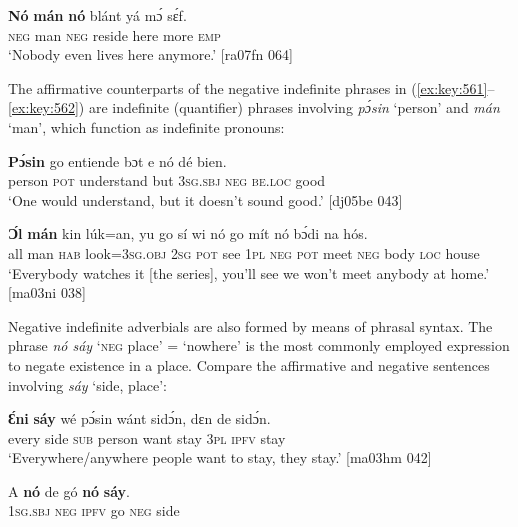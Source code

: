 \ea%
    \label{ex:key:562}
    \gll \textbf{Nó}  \textbf{mán}    \textbf{nó}  blánt  yá    mɔ́    sɛ́f.\\
\textsc{neg}  man    \textsc{neg}  reside  here    more  \textsc{emp}\\

\glt ‘Nobody even lives here anymore.’ [ra07fn 064]
\z

The affirmative counterparts of the negative indefinite phrases in (\ref{ex:key:561}–\ref{ex:key:562}) are indefinite (quantifier) phrases involving \textit{pɔ́sin} ‘person’ and \textit{mán} ‘man’, which function as indefinite pronouns:


\ea%
    \label{ex:key:563}
    \gll \textbf{Pɔ́sin}  go  entiende    bɔt  e    nó  dé    bien.\\
person  \textsc{pot}  understand  but  \textsc{3sg.sbj}  \textsc{neg}  \textsc{be.loc}  good\\

\glt ‘One would understand, but it doesn’t sound good.’ [dj05be 043]
\z


\ea%
    \label{ex:key:564}
    \gll \textbf{Ɔ́l}  \textbf{mán} kin  lúk=an,    yu  go  sí  wi  nó  go
mít    nó  bɔ́di    na  hós.\\
all  man    \textsc{hab}  look=\textsc{3sg.obj}  \textsc{2sg}  \textsc{pot}  see  \textsc{1pl}  \textsc{neg}  \textsc{pot}
meet  \textsc{neg}  body  \textsc{loc}  house\\

\glt ‘Everybody watches it [the series], you’ll see we won’t 
meet anybody at home.’ [ma03ni 038]
\z

Negative indefinite adverbials are also formed by means of phrasal syntax. The phrase \textit{nó sáy} ‘\textsc{neg} place’ = ‘nowhere’ is the most commonly employed expression to negate existence in a place. Compare the affirmative and negative sentences involving \textit{sáy} ‘side, place’: 


\ea%
    \label{ex:key:565}
    \gll \textbf{Ɛ́ni}    \textbf{sáy}  wé  pɔ́sin  wánt  sidɔ́n,  dɛn  de  sidɔ́n.\\
every  side  \textsc{sub}  person  want  stay    \textsc{3pl}  \textsc{ipfv}  stay\\

\glt ‘Everywhere/anywhere people want to stay, they stay.’ [ma03hm 042]
\z


\ea%
    \label{ex:key:566}
    \gll \MakeUppercase{A}   \textbf{nó}  de  gó  \textbf{nó}  \textbf{sáy}.\\
\textsc{1sg.sbj}  \textsc{neg}  \textsc{ipfv}  go  \textsc{neg}  side\\

